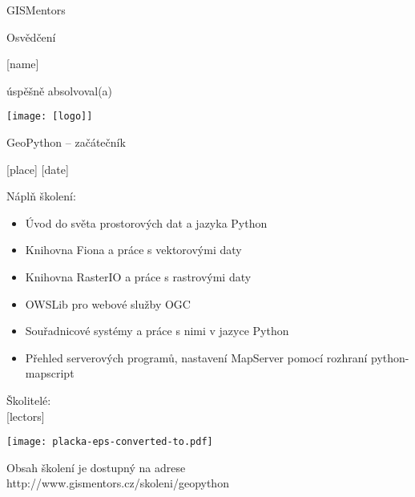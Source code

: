 \documentclass[12pt, a4paper]{letter}
\begin{document}
\pagestyle{empty}
\begin{center}

{\Large GISMentors}

{\Huge Osvědčení}

{\Large [name]}

úspěšně absolvoval(a)

\texttt{[image: [logo]]}

{\Large GeoPython -- začátečník}

[place] [date]
\end{center}

Náplň školení:

\begin{itemize}
    \item Úvod do světa prostorových dat a jazyka Python
    \item Knihovna Fiona a práce s vektorovými daty
    \item Knihovna RasterIO a práce s rastrovými daty
    \item OWSLib pro webové služby OGC
    \item Souřadnicové systémy a práce s nimi v jazyce Python
    \item Přehled serverových programů, nastavení MapServer pomocí rozhraní
            python-mapscript
\end{itemize}

\vfill
\parbox{7cm}{

        Školitelé: \\

        [lectors]
}
\hfill
\parbox{3cm}{
        \texttt{[image: placka-eps-converted-to.pdf]}
}

\vfill

\begin{center}
{\footnotesize Obsah školení je dostupný na adrese
http://www.gismentors.cz/skoleni/geopython}
\end{center}
\end{document}
